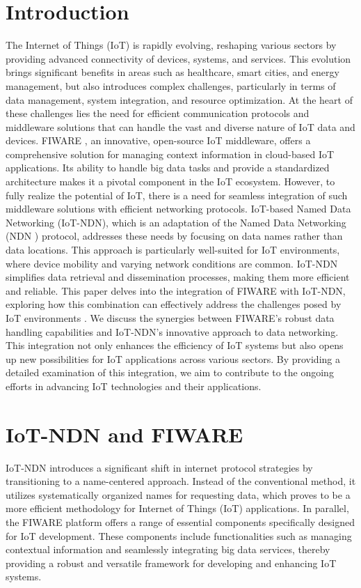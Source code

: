 \documentclass[conference]{IEEEtran}
\begin{document}
\section{Introduction}
The Internet of Things (IoT) is rapidly evolving, reshaping various sectors by providing advanced connectivity of devices, systems, and services. \cite[Alam, 2018]{b1}
This evolution brings significant benefits in areas such as healthcare, smart cities, and energy management, but also introduces complex challenges, particularly in terms of data management, system integration, and resource optimization.
At the heart of these challenges lies the need for efficient communication protocols and middleware solutions that can handle the vast and diverse nature of IoT data and devices.
FIWARE \cite[FIWARE Foundation]{b2}, an innovative, open-source IoT middleware, offers a comprehensive solution for managing context information in cloud-based IoT applications.
Its ability to handle big data tasks and provide a standardized architecture makes it a pivotal component in the IoT ecosystem.
However, to fully realize the potential of IoT, there is a need for seamless integration of such middleware solutions with efficient networking protocols.
IoT-based Named Data Networking (IoT-NDN), which is an adaptation of the Named Data Networking (NDN \cite[Zhang]{b7}) protocol, addresses these needs by focusing on data names rather than data locations.
This approach is particularly well-suited for IoT environments, where device mobility and varying network conditions are common. IoT-NDN simplifies data retrieval and dissemination processes, making them more efficient and reliable.
This paper delves into the integration of FIWARE with IoT-NDN, exploring how this combination can effectively address the challenges posed by IoT environments \cite[Sheng]{b6}.
We discuss the synergies between FIWARE's robust data handling capabilities and IoT-NDN's innovative approach to data networking. This integration not only enhances the efficiency of IoT systems but also opens up new possibilities for IoT applications across various sectors. By providing a detailed examination of this integration, we aim to contribute to the ongoing efforts in advancing IoT technologies and their applications.


\section{IoT-NDN and FIWARE}
IoT-NDN introduces a significant shift in internet protocol strategies by transitioning to a name-centered approach.
Instead of the conventional method, it utilizes systematically organized names for requesting data, which proves to be a more efficient methodology for Internet of Things (IoT) applications.
In parallel, the FIWARE platform offers a range of essential components specifically designed for IoT development.
These components include functionalities such as managing contextual information and seamlessly integrating big data services, thereby providing a robust and versatile framework for developing and enhancing IoT systems.
\end{document}
